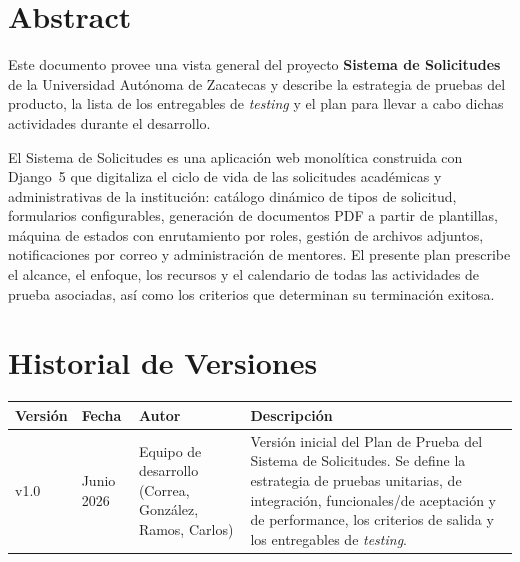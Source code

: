 \documentclass[12pt,letterpaper]{report}
\begin{document}
\tableofcontents\newpage

\chapter*{Abstract}

Este documento provee una vista general del proyecto \textbf{Sistema de
Solicitudes} de la Universidad Autónoma de Zacatecas y describe la estrategia
de pruebas del producto, la lista de los entregables de \emph{testing} y el
plan para llevar a cabo dichas actividades durante el desarrollo.

El Sistema de Solicitudes es una aplicación web monolítica construida con
Django~5 que digitaliza el ciclo de vida de las solicitudes académicas y
administrativas de la institución: catálogo dinámico de tipos de solicitud,
formularios configurables, generación de documentos PDF a partir de plantillas,
máquina de estados con enrutamiento por roles, gestión de archivos adjuntos,
notificaciones por correo y administración de mentores. El presente plan
prescribe el alcance, el enfoque, los recursos y el calendario de todas las
actividades de prueba asociadas, así como los criterios que determinan su
terminación exitosa.

\chapter*{Historial de Versiones}

\begin{center}
\renewcommand{\arraystretch}{1.4}
\begin{tabularx}{\textwidth}{|C{1.6cm}|C{2.4cm}|L{4.2cm}|X|}
\hline
{}
\textbf{Versión} & \textbf{Fecha} & \textbf{Autor} & \textbf{Descripción} \\
\hline
v1.0 & Junio 2026 & Equipo de desarrollo (Correa, González, Ramos, Carlos) &
Versión inicial del Plan de Prueba del Sistema de Solicitudes. Se define la
estrategia de pruebas unitarias, de integración, funcionales/de aceptación y de
performance, los criterios de salida y los entregables de \emph{testing}. \\
\hline
\end{tabularx}
\end{center}
\end{document}
